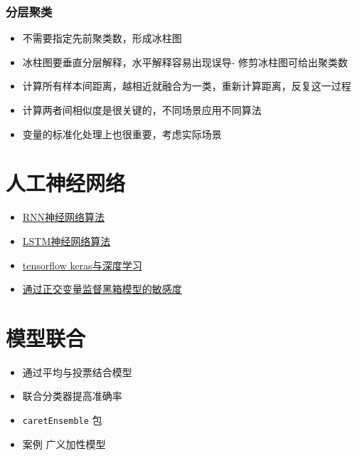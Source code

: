 \documentclass[]{book}
\providecommand{\tightlist}{%
  \setlength{\itemsep}{0pt}\setlength{\parskip}{0pt}}
\begin{document}
\hypertarget{-1}{%
\subsubsection{分层聚类}\label{-1}}

\begin{itemize}
\tightlist
\item
  不需要指定先前聚类数，形成冰柱图
\item
  冰柱图要垂直分层解释，水平解释容易出现误导- 修剪冰柱图可给出聚类数
\item
  计算所有样本间距离，越相近就融合为一类，重新计算距离，反复这一过程
\item
  计算两者间相似度是很关键的，不同场景应用不同算法
\item
  变量的标准化处理上也很重要，考虑实际场景
\end{itemize}

\section{人工神经网络}

\begin{itemize}
\tightlist
\item
  \href{http://karpathy.github.io/2015/05/21/rnn-effectiveness/}{RNN神经网络算法}
\item
  \href{http://livefreeordichotomize.com/2017/11/08/lstm-neural-nets-as-told-by-baseball/}{LSTM神经网络算法}
\item
  \href{https://rstd.io/ml-with-tensorflow-and-r/}{tensorflow keras与深度学习}
\item
  \href{http://blog.fastforwardlabs.com/2017/03/09/fairml-auditing-black-box-predictive-models.html}{通过正交变量监督黑箱模型的敏感度}
\end{itemize}

\section{模型联合}

\begin{itemize}
\tightlist
\item
  通过平均与投票结合模型
\item
  联合分类器提高准确率
\item
  \texttt{caretEnsemble} 包
\item
  案例 广义加性模型
\end{itemize}
\end{document}
